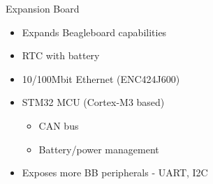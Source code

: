 \documentclass{beamer}
\begin{document}
\begin{frame}{Expansion Board}
\begin{itemize}
	\item Expands Beagleboard capabilities 
	\item RTC with battery
	\item 10/100Mbit Ethernet (ENC424J600)
	\item STM32 MCU (Cortex-M3 based) \begin{itemize}
	\item CAN bus
	\item Battery/power management
\end{itemize}
\item Exposes more BB peripherals - UART, I2C
\end{itemize}
\end{frame}
\end{document}
